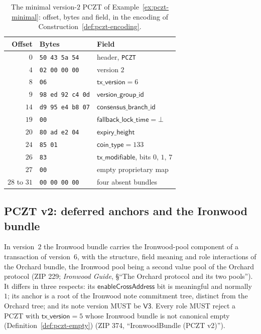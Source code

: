 \documentclass[11pt,a4paper]{article}
\theoremstyle{definition}
\begin{document}
\begin{table}[tp]
\centering
\small
\begin{tabular}{rll}
\toprule
Offset & Bytes & Field \\
\midrule
$0$ & \texttt{50 43 5a 54} & header, \texttt{PCZT} \\
$4$ & \texttt{02 00 00 00} & version $2$ \\
$8$ & \texttt{06} & $\mathsf{tx\_version} = 6$ \\
$9$ & \texttt{98 ed 92 c4 0d} & $\mathsf{version\_group\_id}$ \\
$14$ & \texttt{d9 95 e4 b8 07} & $\mathsf{consensus\_branch\_id}$ \\
$19$ & \texttt{00} & $\mathsf{fallback\_lock\_time} = \bot$ \\
$20$ & \texttt{80 ad e2 04} & $\mathsf{expiry\_height}$ \\
$24$ & \texttt{85 01} & $\mathsf{coin\_type} = 133$ \\
$26$ & \texttt{83} & $\mathsf{tx\_modifiable}$, bits $0$, $1$, $7$ \\
$27$ & \texttt{00} & empty proprietary map \\
$28$ to $31$ & \texttt{00 00 00 00} & four absent bundles \\
\bottomrule
\end{tabular}
\caption{The minimal version-$2$ PCZT of Example~\ref{ex:pczt-minimal}:
offset, bytes and field, in the encoding of
Construction~\ref{def:pczt-encoding}.}
\label{tab:pczt-minimal}
\end{table}

\subsection{PCZT v2: deferred anchors and the Ironwood bundle}
\label{sec:pczt-v2}

In version~$2$ the Ironwood bundle carries the Ironwood-pool component of a
transaction of version~$6$, with the structure, field meaning and role
interactions of the Orchard bundle, the Ironwood pool being a second value
pool of the Orchard protocol (ZIP 229; \emph{Ironwood Guide}, \S``The
Orchard protocol and its two pools''). It differs in three respects: its
$\mathsf{enableCrossAddress}$ bit is meaningful and normally $1$; its anchor
is a root of the Ironwood note commitment tree, distinct from the Orchard
tree; and its note version MUST be $\mathsf{V3}$. Every role MUST reject a
PCZT with $\mathsf{tx\_version} = 5$ whose Ironwood bundle is not canonical
empty (Definition~\ref{def:pczt-empty}) (ZIP 374, ``IronwoodBundle (PCZT
v2)'').
\end{document}
